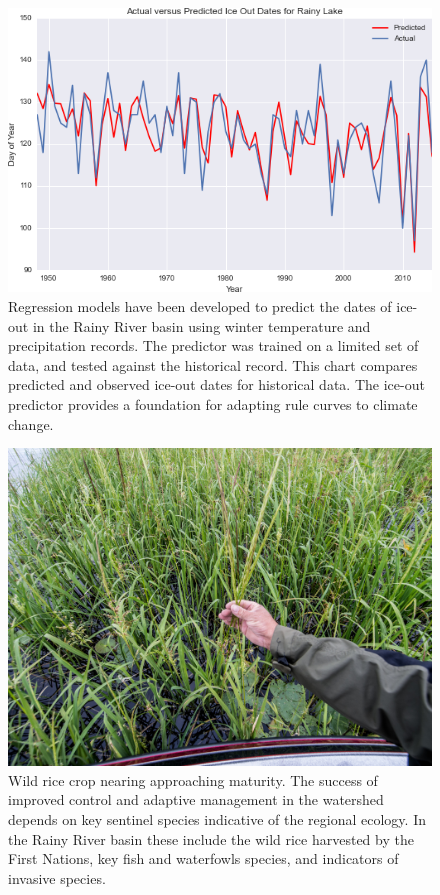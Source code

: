 \documentclass[preprint,times]{elsarticle}
\begin{document}
\begin{figure}
\includegraphics[width=\linewidth]{figures/IceOutPredictor}
\caption{Regression models have been developed to predict the dates of ice-out in the Rainy River basin using winter temperature and precipitation records. The predictor was trained on a limited set of data, and tested against the historical record. This chart compares predicted and observed ice-out dates for historical data.  The ice-out predictor provides a foundation for adapting rule curves to climate change.}\label{figure:11}
\end{figure}

\begin{figure}
\includegraphics[width=\linewidth]{figures/20150804_194209.jpg}
\caption{Wild rice crop nearing approaching maturity. The success of improved control and adaptive management in the watershed depends on key sentinel species indicative of the regional ecology. In the Rainy River basin these include the wild rice harvested by the First Nations, key fish and waterfowls species, and indicators of invasive species.}\label{figure:12}
\end{figure}
\end{document}
